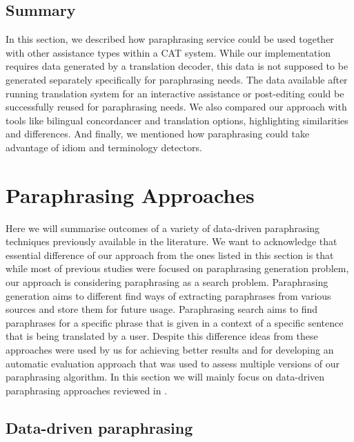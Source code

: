 \subsection{Summary}

In this section, we described how paraphrasing service could be used together with other assistance types within a CAT system. While our implementation requires data generated by a translation decoder, this data is not supposed to be generated separately specifically for paraphrasing needs. The data available after running translation system for an interactive assistance or post-editing could be successfully reused for paraphrasing needs. We also compared our approach with tools like bilingual concordancer and translation options, highlighting similarities and differences. And finally, we mentioned how paraphrasing could take advantage of idiom and terminology detectors.

\section{Paraphrasing Approaches}

Here we will summarise outcomes of a variety of data-driven paraphrasing techniques previously available in the literature. We want to acknowledge that essential difference of our approach from the ones listed in this section is that while most of previous studies were focused on paraphrasing generation problem, our approach is considering paraphrasing as a search problem. Paraphrasing generation aims to different find ways of extracting paraphrases from various sources and store them for future usage. Paraphrasing search aims to find paraphrases for a specific phrase that is given in a context of a specific sentence that is being translated by a user. Despite this difference ideas from these approaches were used by us for achieving better results and for developing an automatic evaluation approach that was used to assess multiple versions of our paraphrasing algorithm. In this section we will mainly focus on data-driven paraphrasing approaches reviewed in \cite{Callison-Burch2007}. 

\subsection{Data-driven paraphrasing}

